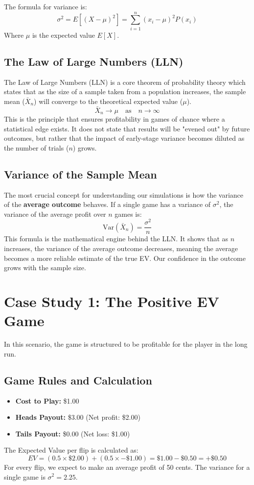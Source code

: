 \documentclass[12pt]{article}
\begin{document}
The formula for variance is:
\[
\sigma^2 = E[(X - \mu)^2] = \sum_{i=1}^{n} (x_i - \mu)^2 P(x_i)
\]
Where $\mu$ is the expected value $E[X]$.

\subsection{The Law of Large Numbers (LLN)}
The Law of Large Numbers (LLN) is a core theorem of probability theory which states that as the size of a sample taken from a population increases, the sample mean ($\bar{X}_n$) will converge to the theoretical expected value ($\mu$).
\[
\bar{X}_n \to \mu \quad \text{as} \quad n \to \infty
\]
This is the principle that ensures profitability in games of chance where a statistical edge exists. It does not state that results will be "evened out" by future outcomes, but rather that the impact of early-stage variance becomes diluted as the number of trials ($n$) grows.

\subsection{Variance of the Sample Mean}
The most crucial concept for understanding our simulations is how the variance of the \textbf{average outcome} behaves. If a single game has a variance of $\sigma^2$, the variance of the average profit over $n$ games is:
\[
\text{Var}(\bar{X}_n) = \frac{\sigma^2}{n}
\]
This formula is the mathematical engine behind the LLN. It shows that as $n$ increases, the variance of the average outcome decreases, meaning the average becomes a more reliable estimate of the true EV. Our confidence in the outcome grows with the sample size.

\clearpage

\section{Case Study 1: The Positive EV Game}
In this scenario, the game is structured to be profitable for the player in the long run.

\subsection{Game Rules and Calculation}
\begin{itemize}
    \item \textbf{Cost to Play:} \$1.00
    \item \textbf{Heads Payout:} \$3.00 (Net profit: \$2.00)
    \item \textbf{Tails Payout:} \$0.00 (Net loss: \$1.00)
\end{itemize}
The Expected Value per flip is calculated as:
\[
EV = (0.5 \times \$2.00) + (0.5 \times -\$1.00) = \$1.00 - \$0.50 = \boldsymbol{+\$0.50}
\]
For every flip, we expect to make an average profit of 50 cents. The variance for a single game is $\sigma^2 = 2.25$.
\end{document}
